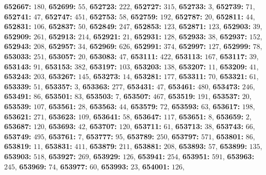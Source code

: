 \textsf{\bfseries 652667:} $180$, \textsf{\bfseries 652699:} $55$, \textsf{\bfseries 652723:} $222$, \textsf{\bfseries 652727:} $315$, \textsf{\bfseries 652733:} $3$, \textsf{\bfseries 652739:} $71$, \textsf{\bfseries 652741:} $47$, \textsf{\bfseries 652747:} $451$, \textsf{\bfseries 652753:} $58$, \textsf{\bfseries 652759:} $192$, \textsf{\bfseries 652787:} $20$, \textsf{\bfseries 652811:} $44$, \textsf{\bfseries 652831:} $106$, \textsf{\bfseries 652837:} $50$, \textsf{\bfseries 652849:} $247$, \textsf{\bfseries 652853:} $123$, \textsf{\bfseries 652871:} $123$, \textsf{\bfseries 652903:} $39$, \textsf{\bfseries 652909:} $261$, \textsf{\bfseries 652913:} $214$, \textsf{\bfseries 652921:} $21$, \textsf{\bfseries 652931:} $128$, \textsf{\bfseries 652933:} $38$, \textsf{\bfseries 652937:} $152$, \textsf{\bfseries 652943:} $208$, \textsf{\bfseries 652957:} $34$, \textsf{\bfseries 652969:} $626$, \textsf{\bfseries 652991:} $374$, \textsf{\bfseries 652997:} $127$, \textsf{\bfseries 652999:} $78$, \textsf{\bfseries 653033:} $251$, \textsf{\bfseries 653057:} $20$, \textsf{\bfseries 653083:} $47$, \textsf{\bfseries 653111:} $422$, \textsf{\bfseries 653113:} $167$, \textsf{\bfseries 653117:} $39$, \textsf{\bfseries 653143:} $91$, \textsf{\bfseries 653153:} $382$, \textsf{\bfseries 653197:} $103$, \textsf{\bfseries 653203:} $138$, \textsf{\bfseries 653207:} $11$, \textsf{\bfseries 653209:} $41$, \textsf{\bfseries 653243:} $203$, \textsf{\bfseries 653267:} $145$, \textsf{\bfseries 653273:} $14$, \textsf{\bfseries 653281:} $177$, \textsf{\bfseries 653311:} $70$, \textsf{\bfseries 653321:} $61$, \textsf{\bfseries 653339:} $51$, \textsf{\bfseries 653357:} $3$, \textsf{\bfseries 653363:} $277$, \textsf{\bfseries 653431:} $47$, \textsf{\bfseries 653461:} $480$, \textsf{\bfseries 653473:} $246$, \textsf{\bfseries 653491:} $86$, \textsf{\bfseries 653501:} $83$, \textsf{\bfseries 653503:} $7$, \textsf{\bfseries 653507:} $467$, \textsf{\bfseries 653519:} $191$, \textsf{\bfseries 653537:} $20$, \textsf{\bfseries 653539:} $107$, \textsf{\bfseries 653561:} $28$, \textsf{\bfseries 653563:} $44$, \textsf{\bfseries 653579:} $72$, \textsf{\bfseries 653593:} $63$, \textsf{\bfseries 653617:} $198$, \textsf{\bfseries 653621:} $271$, \textsf{\bfseries 653623:} $109$, \textsf{\bfseries 653641:} $58$, \textsf{\bfseries 653647:} $117$, \textsf{\bfseries 653651:} $8$, \textsf{\bfseries 653659:} $2$, \textsf{\bfseries 653687:} $120$, \textsf{\bfseries 653693:} $42$, \textsf{\bfseries 653707:} $120$, \textsf{\bfseries 653711:} $61$, \textsf{\bfseries 653713:} $38$, \textsf{\bfseries 653743:} $66$, \textsf{\bfseries 653749:} $495$, \textsf{\bfseries 653761:} $7$, \textsf{\bfseries 653777:} $95$, \textsf{\bfseries 653789:} $250$, \textsf{\bfseries 653797:} $571$, \textsf{\bfseries 653801:} $86$, \textsf{\bfseries 653819:} $11$, \textsf{\bfseries 653831:} $411$, \textsf{\bfseries 653879:} $211$, \textsf{\bfseries 653881:} $208$, \textsf{\bfseries 653893:} $57$, \textsf{\bfseries 653899:} $135$, \textsf{\bfseries 653903:} $518$, \textsf{\bfseries 653927:} $269$, \textsf{\bfseries 653929:} $126$, \textsf{\bfseries 653941:} $254$, \textsf{\bfseries 653951:} $591$, \textsf{\bfseries 653963:} $245$, \textsf{\bfseries 653969:} $74$, \textsf{\bfseries 653977:} $60$, \textsf{\bfseries 653993:} $23$, \textsf{\bfseries 654001:} $126$, 
